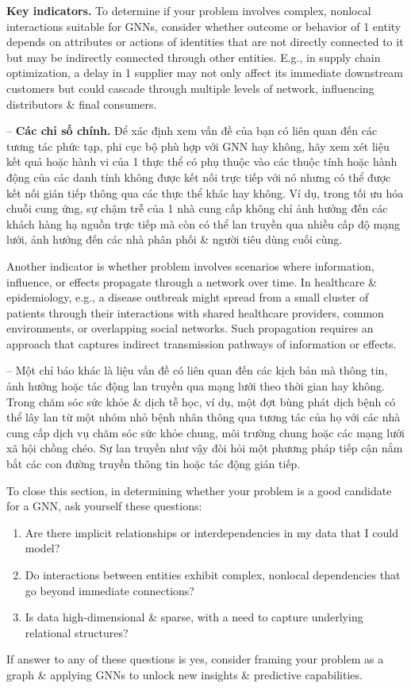 \documentclass{article}
\begin{document}
\begin{itemize}
\begin{itemize}
\begin{itemize}
            {\bf Key indicators.} To determine if your problem involves complex, nonlocal interactions suitable for GNNs, consider whether outcome or behavior of 1 entity depends on attributes or actions of identities that are not directly connected to it but may be indirectly connected through other entities. E.g., in supply chain optimization, a delay in 1 supplier may not only affect its immediate downstream customers but could cascade through multiple levels of network, influencing distributors \& final consumers.

            -- {\bf Các chỉ số chính.} Để xác định xem vấn đề của bạn có liên quan đến các tương tác phức tạp, phi cục bộ phù hợp với GNN hay không, hãy xem xét liệu kết quả hoặc hành vi của 1 thực thể có phụ thuộc vào các thuộc tính hoặc hành động của các danh tính không được kết nối trực tiếp với nó nhưng có thể được kết nối gián tiếp thông qua các thực thể khác hay không. Ví dụ, trong tối ưu hóa chuỗi cung ứng, sự chậm trễ của 1 nhà cung cấp không chỉ ảnh hưởng đến các khách hàng hạ nguồn trực tiếp mà còn có thể lan truyền qua nhiều cấp độ mạng lưới, ảnh hưởng đến các nhà phân phối \& người tiêu dùng cuối cùng.

            Another indicator is whether problem involves scenarios where information, influence, or effects propagate through a network over time. In healthcare \& epidemiology, e.g., a disease outbreak might spread from a small cluster of patients through their interactions with shared healthcare providers, common environments, or overlapping social networks. Such propagation requires an approach that captures indirect transmission pathways of information or effects.

            -- Một chỉ báo khác là liệu vấn đề có liên quan đến các kịch bản mà thông tin, ảnh hưởng hoặc tác động lan truyền qua mạng lưới theo thời gian hay không. Trong chăm sóc sức khỏe \& dịch tễ học, ví dụ, một đợt bùng phát dịch bệnh có thể lây lan từ một nhóm nhỏ bệnh nhân thông qua tương tác của họ với các nhà cung cấp dịch vụ chăm sóc sức khỏe chung, môi trường chung hoặc các mạng lưới xã hội chồng chéo. Sự lan truyền như vậy đòi hỏi một phương pháp tiếp cận nắm bắt các con đường truyền thông tin hoặc tác động gián tiếp.

            To close this section, in determining whether your problem is a good candidate for a GNN, ask yourself these questions:
            \begin{enumerate}
                \item Are there implicit relationships or interdependencies in my data that I could model?
                \item Do interactions between entities exhibit complex, nonlocal dependencies that go beyond immediate connections?
                \item Is data high-dimensional \& sparse, with a need to capture underlying relational structures?
            \end{enumerate}
            If answer to any of these questions is yes, consider framing your problem as a graph \& applying GNNs to unlock new insights \& predictive capabilities.


\end{itemize}
\end{itemize}
\end{itemize}
\end{document}
